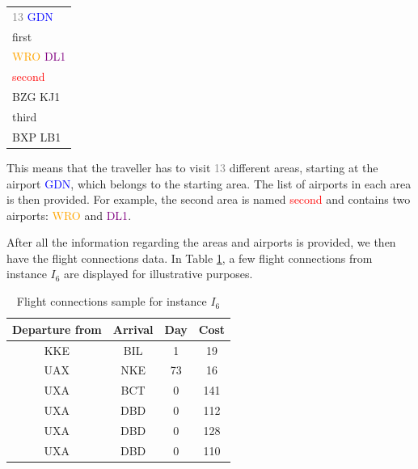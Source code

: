 \documentclass[conference]{IEEEtran}
\begin{document}
\begin{center}
    \begin{tabular}{|l|}
    \hline
        \textcolor{gray}{13} \textcolor{blue}{GDN}      \\
        first                                           \\
        \textcolor{orange}{WRO} \textcolor{purple}{DL1} \\
        \textcolor{red}{second}                         \\
        BZG KJ1                                         \\
        third                                           \\
        BXP LB1                                         \\
    \hline
    \end{tabular}
\end{center}

This means that the traveller has to visit \textcolor{gray}{13} different areas, starting at the airport \textcolor{blue}{GDN}, which belongs to the starting area. The list of airports in each area is then provided. For example, the second area is named \textcolor{red}{second} and contains two airports: \textcolor{orange}{WRO} and \textcolor{purple}{DL1}.

After all the information regarding the areas and airports is provided, we then have the flight connections data. In Table \ref{table:Flight connections sample I6}, a few flight connections from instance \( I_6 \) are displayed for illustrative purposes.

\begin{table}
    \centering
    \caption{Flight connections sample for instance $I_6$}
    \begin{tabular}{cccc}
        \toprule
        Departure from & Arrival & Day & Cost \\ %
        \midrule
        KKE            & BIL     & 1   & 19   \\
        UAX            & NKE     & 73  & 16   \\
        UXA            & BCT     & 0   & 141  \\
        UXA            & DBD     & 0   & 112  \\
        UXA            & DBD     & 0   & 128  \\
        UXA            & DBD     & 0   & 110  \\
        \bottomrule
    \end{tabular}
    \label{table:Flight connections sample I6}
\end{table}
\end{document}
